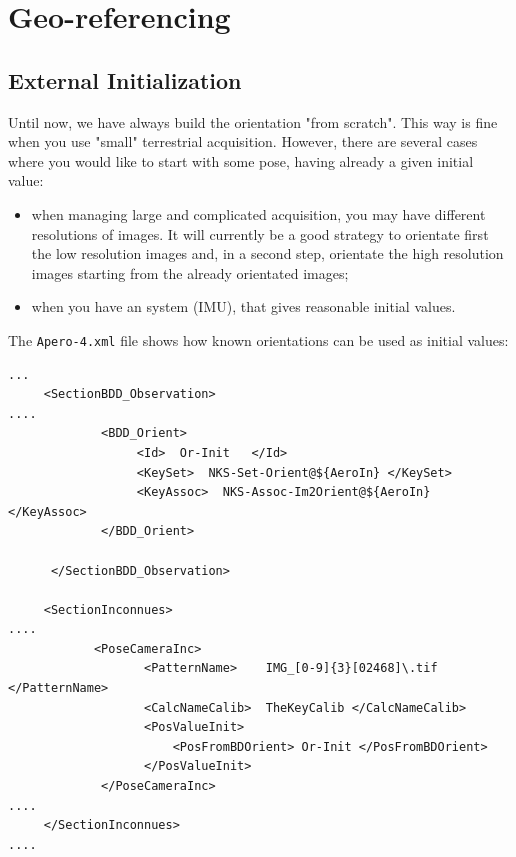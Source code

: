 
\section{Geo-referencing}

\subsection{External Initialization}

Until now, we have always build the orientation "from scratch". This way is
fine when you use "small" terrestrial acquisition. However, there are
several cases where you would like to start with some pose, having
already a given initial value:

\begin{itemize}
   \item when managing large and complicated acquisition, you may have
         different resolutions of images. It will currently be a good strategy to
         orientate first the low resolution images and, in a second step,
         orientate the high resolution images starting from the already orientated images;

   \item when you have an  %
    system (IMU), that gives reasonable initial values.
\end{itemize}

The {\tt Apero-4.xml} file shows how known orientations can be used as initial
values:

{\scriptsize
\begin{verbatim}
...
     <SectionBDD_Observation>
....
             <BDD_Orient>
                  <Id>  Or-Init   </Id>
                  <KeySet>  NKS-Set-Orient@${AeroIn} </KeySet>
                  <KeyAssoc>  NKS-Assoc-Im2Orient@${AeroIn} </KeyAssoc>
             </BDD_Orient>

      </SectionBDD_Observation>

     <SectionInconnues>
....
            <PoseCameraInc>
                   <PatternName>    IMG_[0-9]{3}[02468]\.tif  </PatternName>
                   <CalcNameCalib>  TheKeyCalib </CalcNameCalib>
                   <PosValueInit>
                       <PosFromBDOrient> Or-Init </PosFromBDOrient>
                   </PosValueInit>
             </PoseCameraInc>
....
     </SectionInconnues>
....
\end{verbatim}
}

